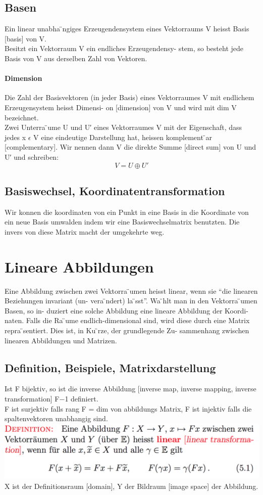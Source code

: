 \documentclass[11pt]{article}
\newcommand\back[1][-3cm]{\hspace*{#1}}
\begin{document}
\subsection{Basen}
Ein linear unabha ̈ngiges Erzeugendensystem eines Vektorraums V heisst Basis [basis] von V.\\
Besitzt ein Vektorraum V ein endliches Erzeugendensy- stem, so besteht jede Basis von V aus derselben Zahl von Vektoren.
\paragraph{Dimension}
Die Zahl der Basisvektoren (in jeder Basis) eines Vektorraumes V mit endlichem Erzeugensystem heisst Dimensi- on [dimension] von V und wird mit dim V bezeichnet.\\
Zwei Unterra ̈ume U und U′ eines Vektorraumes V mit der Eigenschaft, dass jedes x $\epsilon$ V eine eindeutige Darstellung hat, heissen komplement ̈ar [complementary]. Wir nennen dann V die direkte Summe [direct sum] von U und U′ und schreiben:
\begin{equation}
	V = U \oplus U'
\end{equation}
\subsection{Basiswechsel, Koordinatentransformation}
Wir konnen die koordinaten von ein Punkt in eine Basis in die Koordinate von ein neue Basis umwalden indem wir eine Basiswechselmatrix benutzten. Die invers von diese Matrix macht der umgekehrte weg.
\section{Lineare Abbildungen}
Eine Abbildung zwischen zwei Vektorra ̈umen heisst linear, wenn sie “die linearen Beziehungen invariant (un- vera ̈ndert) la ̈sst”. Wa ̈hlt man in den Vektorra ̈umen Basen, so in- duziert eine solche Abbildung eine lineare Abbildung der Koordi- naten. Falls die Ra ̈ume endlich-dimensional sind, wird diese durch eine Matrix repra ̈sentiert. Dies ist, in Ku ̈rze, der grundlegende Zu- sammenhang zwischen linearen Abbildungen und Matrizen.
\subsection{Definition, Beispiele, Matrixdarstellung}
Ist F bijektiv, so ist die inverse Abbildung [inverse map, inverse mapping, inverse transformation] F−1 definiert.\\
F ist surjektiv falls rang F = dim von abbildungs Matrix, F ist injektiv falls die spaltenvektoren unabhangig sind.
\back\includegraphics{images/linear}\\
X ist der Definitionsraum [domain], Y der Bildraum [image space] der Abbildung.
\end{document}
